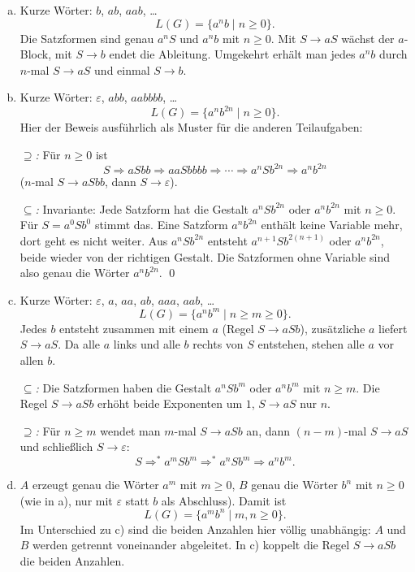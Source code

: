 \begin{loesung}
\begin{enumerate}[a)]
  \item Kurze Wörter: $b$, $ab$, $aab$, \ldots
  \[L(G)=\{a^nb\mid n\geq 0\}.\]
  Die Satzformen sind genau $a^nS$ und $a^nb$ mit $n\geq0$. Mit $S\to aS$ wächst der $a$-Block, mit $S\to b$ endet die Ableitung. Umgekehrt erhält man jedes $a^nb$ durch $n$-mal $S\to aS$ und einmal $S\to b$.

  \item Kurze Wörter: $\varepsilon$, $abb$, $aabbbb$, \ldots
  \[L(G)=\{a^nb^{2n}\mid n\geq 0\}.\]
  Hier der Beweis ausführlich als Muster für die anderen Teilaufgaben:

  \emph{$\supseteq$:} Für $n\geq0$ ist
  \[S\Rightarrow aSbb\Rightarrow aaSbbbb\Rightarrow\cdots\Rightarrow a^nSb^{2n}\Rightarrow a^nb^{2n}\]
  ($n$-mal $S\to aSbb$, dann $S\to\varepsilon$).

  \emph{$\subseteq$:} Invariante: Jede Satzform hat die Gestalt $a^nSb^{2n}$ oder $a^nb^{2n}$ mit $n\geq0$. Für $S=a^0Sb^0$ stimmt das. Eine Satzform $a^nb^{2n}$ enthält keine Variable mehr, dort geht es nicht weiter. Aus $a^nSb^{2n}$ entsteht $a^{n+1}Sb^{2(n+1)}$ oder $a^nb^{2n}$, beide wieder von der richtigen Gestalt. Die Satzformen ohne Variable sind also genau die Wörter $a^nb^{2n}$. \qed

  \item Kurze Wörter: $\varepsilon$, $a$, $aa$, $ab$, $aaa$, $aab$, \ldots
  \[L(G)=\{a^nb^m\mid n\geq m\geq 0\}.\]
  Jedes $b$ entsteht zusammen mit einem $a$ (Regel $S\to aSb$), zusätzliche $a$ liefert $S\to aS$. Da alle $a$ links und alle $b$ rechts von $S$ entstehen, stehen alle $a$ vor allen $b$.

  \emph{$\subseteq$:} Die Satzformen haben die Gestalt $a^nSb^m$ oder $a^nb^m$ mit $n\geq m$. Die Regel $S\to aSb$ erhöht beide Exponenten um $1$, $S\to aS$ nur $n$.

  \emph{$\supseteq$:} Für $n\geq m$ wendet man $m$-mal $S\to aSb$ an, dann $(n-m)$-mal $S\to aS$ und schließlich $S\to\varepsilon$:
  \[S\Rightarrow^* a^mSb^m\Rightarrow^* a^nSb^m\Rightarrow a^nb^m.\]

  \item $A$ erzeugt genau die Wörter $a^m$ mit $m\geq0$, $B$ genau die Wörter $b^n$ mit $n\geq0$ (wie in a), nur mit $\varepsilon$ statt $b$ als Abschluss). Damit ist
  \[L(G)=\{a^mb^n\mid m,n\geq 0\}.\]
  Im Unterschied zu c) sind die beiden Anzahlen hier völlig unabhängig: $A$ und $B$ werden getrennt voneinander abgeleitet. In c) koppelt die Regel $S\to aSb$ die beiden Anzahlen.


\end{enumerate}
\end{loesung}
